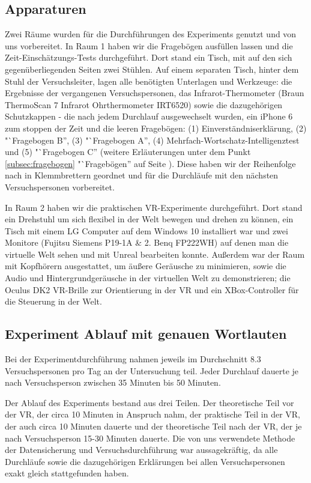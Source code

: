 \documentclass{Bericht}
\begin{document}
\subsection {Apparaturen}
Zwei Räume wurden für die Durchführungen des Experiments genutzt und von uns vorbereitet. In Raum 1 haben wir die Fragebögen ausfüllen lassen und die Zeit-Einschätzungs-Tests durchgeführt. Dort stand ein Tisch, mit auf den sich gegenüberliegenden Seiten zwei Stühlen. Auf einem separaten Tisch, hinter dem Stuhl der Versuchsleiter, lagen alle benötigten Unterlagen und Werkzeuge: die Ergebnisse der vergangenen Versuchspersonen, das Infrarot-Thermometer (Braun ThermoScan 7 Infrarot Ohrthermometer IRT6520) sowie die dazugehörigen Schutzkappen - die nach jedem Durchlauf ausgewechselt wurden, ein iPhone 6 zum stoppen der Zeit und die leeren Fragebögen: (1) Einverständniserklärung, (2)  "`Fragebogen B'', (3) "`Fragebogen A'', (4) Mehrfach-Wortschatz-Intelligenztest und (5) "`Fragebogen C'' (weitere Erläuterungen unter dem Punkt \ref{subsec:fragebogen} "`Fragebögen'' auf Seite \pageref{subsec:fragebogen}). Diese haben wir der Reihenfolge nach in Klemmbrettern geordnet und für die Durchläufe mit den nächsten Versuchspersonen vorbereitet. 

In Raum 2 haben wir die praktischen VR-Experimente durchgeführt. Dort stand ein Drehstuhl um sich flexibel in der Welt bewegen und drehen zu können, ein Tisch mit einem LG Computer auf dem  Windows 10 installiert war und zwei Monitore (Fujitsu Siemens P19-1A \& 2. Benq FP222WH) auf denen man die virtuelle Welt sehen und mit Unreal bearbeiten konnte. Außerdem war der Raum mit Kopfhörern ausgestattet, um äußere Geräusche zu minimieren, sowie die Audio und Hintergrundgeräusche in der virtuellen Welt zu demonstrieren; die Oculus DK2 VR-Brille zur Orientierung in der VR und ein XBox-Controller für die Steuerung in der Welt.

\subsection {Experiment Ablauf mit genauen Wortlauten}
Bei der Experimentdurchführung nahmen jeweils im Durchschnitt 8.3 Versuchspersonen pro Tag an der Untersuchung teil. Jeder Durchlauf dauerte je nach Versuchsperson zwischen 35 Minuten bis 50 Minuten.

Der Ablauf des Experiments bestand aus drei Teilen. Der theoretische Teil vor der VR, der circa 10 Minuten in Anspruch nahm, der praktische Teil in der VR, der auch circa 10 Minuten dauerte und der theoretische Teil nach der VR, der je nach Versuchsperson 15-30 Minuten dauerte. Die von uns verwendete Methode der Datensicherung und Versuchsdurchführung war aussagekräftig, da alle Durchläufe sowie die dazugehörigen Erklärungen bei allen Versuchspersonen exakt gleich stattgefunden haben.
\end{document}
